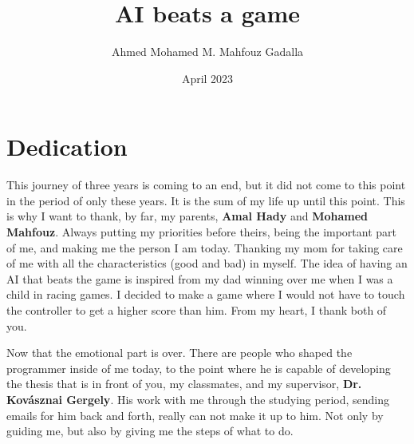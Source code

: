 \documentclass{thesis-ekf}
\begin{document}
	
	\author{Ahmed Mohamed M. Mahfouz Gadalla}
	\title{AI beats a game}
	\date{April 2023}
	
	
	\maketitle
	\tableofcontents
	
	\chapter*{Dedication}
This journey of three years is coming to an end, but it did not come to this point in the period of only these years. It is the sum of my life up until this point. This is why I want to thank, by far, my parents, \textbf{Amal Hady} and \textbf{Mohamed Mahfouz}. Always putting my priorities before theirs, being the important part of me, and making me the person I am today. Thanking my mom for taking care of me with all the characteristics (good and bad) in myself. The idea of having an AI that beats the game is inspired from my dad winning over me when I was a child in racing games. I decided to make a game where I would not have to touch the controller to get a higher score than him. From my heart, I thank both of you.
	
Now that the emotional part is over. There are people who shaped the programmer inside of me today, to the point where he is capable of developing the thesis that is in front of you, my classmates, and my supervisor, \textbf{Dr. Kovásznai Gergely}. His work with me through the studying period, sending emails for him back and forth, really can not make it up to him. Not only by guiding me, but also by giving me the steps of what to do. 



	

	
	
	
	
	

	
	
	

	\printbibliography

	
\end{document}
